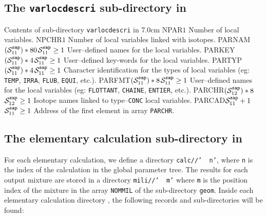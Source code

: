 \subsection{The {\tt varlocdescri} sub-directory in }\label{sect:sapdirlocvar}

\vskip -0.5cm

\begin{DescriptionEnregistrement}{Contents of sub-directory {\tt varlocdescri} in }{7.0cm}
\IntEnr
  {NPAR}{$1$}
  {Number of local variables.}
\IntEnr
  {NPCHR}{$1$}
  {Number of local variables linked with isotopes.}
\OptCharEnr
  {PARNAM}{$(\mathcal{S}^{\tt sap}_{11})*80$}{$\mathcal{S}^{\tt sap}_{11}\ge 1$}
  {User--defined names for the local variables.}
\OptCharEnr
  {PARKEY}{$(\mathcal{S}^{\tt sap}_{11})*4$}{$\mathcal{S}^{\tt sap}_{11}\ge 1$}
  {User--defined key-words for the local variables.}
\OptCharEnr
  {PARTYP}{$(\mathcal{S}^{\tt sap}_{11})*4$}{$\mathcal{S}^{\tt sap}_{11}\ge 1$}
  {Character identification for the types of local variables (eg: {\tt TEMP}, {\tt IRRA}, {\tt FLUB},
  {\tt EQUI}, etc.).}
\OptCharEnr
  {PARFMT}{$(\mathcal{S}^{\tt sap}_{11})*8$}{$\mathcal{S}^{\tt sap}_{11}\ge 1$}
  {User--defined names for the local variables (eg: {\tt FLOTTANT}, {\tt CHAINE}, {\tt ENTIER}, etc.).}
\OptCharEnr
  {PARCHR}{$(\mathcal{S}^{\tt sap}_{12})*8$}{$\mathcal{S}^{\tt sap}_{12}\ge 1$}
  {Isotope names linked to type--{\tt CONC} local variables.}
\OptIntEnr
  {PARCAD}{$\mathcal{S}^{\tt sap}_{11}+1$}{$\mathcal{S}^{\tt sap}_{11}\ge 1$}
  {Address of the first element in array {\tt PARCHR}.}
\end{DescriptionEnregistrement}

\subsection{The elementary calculation sub-directory  in }\label{sect:sapdircalc}

For each elementary calculation, we define a directory {\tt calc//'~~n'}, where {\tt n} is the index
of the calculation in the global parameter tree. The results for each output mixture are stored in a
directory {\tt mili//'~~m'} where {\tt m} is the position index of the mixture in the array {\tt NOMMIL}
of the sub-directory {\tt geom}. Inside each elementary calculation directory , the following
records and sub-directories will be found:

